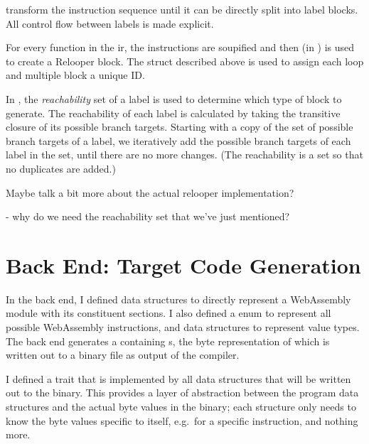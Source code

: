\documentclass[00-main.tex]{subfiles}
\begin{document}
 transform the instruction sequence until it can be directly split into label blocks.
All control flow between labels is made explicit.

For every function in the \gls{ir}, the instructions are soupified and then  (in ) is used to create a Relooper block.
The  struct described above is used to assign each loop and multiple block a unique ID\@.

In , the \emph{reachability} set of a label is used to determine which type of block to generate.
The reachability of each label is calculated by taking the transitive closure of its possible branch targets.
Starting with a copy of the set of possible branch targets of a label, we iteratively add the possible branch targets of each label in the set, until there are no more changes.
(The reachability is a set so that no duplicates are added.)

\begin{mrwComment}
  Maybe talk a bit more about the actual relooper implementation?

  - why do we need the reachability set that we've just mentioned?
\end{mrwComment}

\section{Back End: Target Code Generation}

In the back end, I defined data structures to directly represent a WebAssembly module with its constituent sections.
I also defined a  enum to represent all possible WebAssembly instructions, and data structures to represent value types.
The back end generates a  containing s, the byte representation of which is written out to a binary file as output of the compiler.

I defined a  trait that is implemented by all data structures that will be written out to the binary.
This provides a layer of abstraction between the program data structures and the actual byte values in the binary; each structure only needs to know the byte values specific to itself, e.g.~for a specific instruction, and nothing more.
\end{document}
